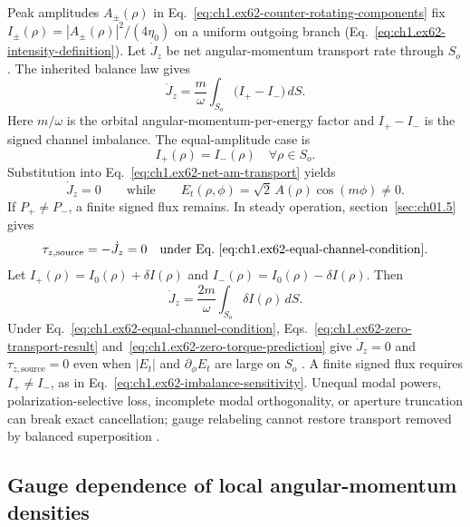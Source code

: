 Peak amplitudes $A_\pm(\rho)$ in Eq.~\eqref{eq:ch1.ex62-counter-rotating-components} fix $I_\pm(\rho)=|A_\pm(\rho)|^2/(4\eta_0)$ on a uniform outgoing branch (Eq.~\eqref{eq:ch1.ex62-intensity-definition}). Let
\(\dot J_z\) be net angular-momentum transport rate through \(S_o\). The inherited
balance law gives
\begin{equation}
\label{eq:ch1.ex62-net-am-transport}
\dot J_z
=
\frac{m}{\omega}
\int_{S_o}\!\big(I_+-I_-\big)\,dS.
\end{equation}
Here \(m/\omega\) is the orbital angular-momentum-per-energy factor and \(I_+-I_-\) is the signed channel imbalance. The equal-amplitude case is
\begin{equation}
\label{eq:ch1.ex62-equal-channel-condition}
I_+(\rho)=I_-(\rho)\quad\forall \rho\in S_o.
\end{equation}
Substitution into Eq.~\eqref{eq:ch1.ex62-net-am-transport} yields
\begin{equation}
\label{eq:ch1.ex62-zero-transport-result}
\dot J_z=0
\qquad\text{while}\qquad
E_t(\rho,\phi)=\sqrt{2}\,A(\rho)\cos(m\phi)\neq 0.
\end{equation}
If \(P_+\neq P_-\), a finite signed flux remains. In steady operation, section~\ref{sec:ch01.5} gives
\begin{equation}
\label{eq:ch1.ex62-zero-torque-prediction}
\tau_{z,\mathrm{source}}
=
-\dot J_z
=
0
\quad\text{under Eq.~\eqref{eq:ch1.ex62-equal-channel-condition}}.
\end{equation}
Let
\(I_+(\rho)=I_0(\rho)+\delta I(\rho)\) and
\(I_-(\rho)=I_0(\rho)-\delta I(\rho)\). Then
\begin{equation}
\label{eq:ch1.ex62-imbalance-sensitivity}
\dot J_z
=
\frac{2m}{\omega}\int_{S_o}\delta I(\rho)\,dS.
\end{equation}
\label{prop:ch1.ex62-phase-insufficiency}
Under Eq.~\eqref{eq:ch1.ex62-equal-channel-condition}, Eqs.~\eqref{eq:ch1.ex62-zero-transport-result} and~\eqref{eq:ch1.ex62-zero-torque-prediction} give \(\dot J_z=0\) and \(\tau_{z,\mathrm{source}}=0\) even when \(|E_t|\) and \(\partial_\phi E_t\) are large on \(S_o\) \cite{stratton1941,beth1936}. A finite signed flux requires \(I_+\neq I_-\), as in Eq.~\eqref{eq:ch1.ex62-imbalance-sensitivity}. Unequal modal powers, polarization-selective loss, incomplete modal orthogonality, or aperture truncation can break exact cancellation; gauge relabeling cannot restore transport removed by balanced superposition \cite{poynting1884,harrington2001}.
\subsection{Gauge dependence of local angular-momentum densities}
\label{sec:ch01.6.3}

